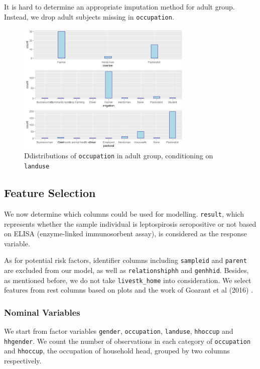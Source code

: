 \documentclass[11pt,twoside]{article}
\numberwithin{Theorem}{section}
\numberwithin{Definition}{section}
\numberwithin{Lemma}{section}
\numberwithin{Algorithm}{section}
\numberwithin{equation}{section}
\begin{document}
It is hard to determine an appropriate imputation method for adult group. Instead, we drop adult subjects missing in \texttt{occupation}.

\begin{figure}[!h]
	\centering
	\includegraphics[width = 0.75\textwidth]{Images/occupation_landuse.png}
	\caption{Ddistributions of \texttt{occupation} in adult group, conditioning on \texttt{landuse}}
	\label{fig:occ3}		
\end{figure} 

\subsection{Feature Selection}

We now determine which columns could be used for modelling. \texttt{result}, which represents whether the sample individual is leptospirosis seropositive or not based on ELISA (enzyme-linked immunosorbent assay), is considered as the response variable. 

As for potential risk factors, identifier columns including \texttt{sampleid} and \texttt{parent} are excluded from our model, as well as \texttt{relationshiphh} and \texttt{genhhid}. Besides, as mentioned before, we do not take \texttt{livestk\_home} into consideration. We select features from rest columns based on plots and the work of Goarant et al (2016) \cite{goarant2016leptospirosis}. 

\subsubsection{Nominal Variables}

We start from factor variables \texttt{gender}, \texttt{occupation}, \texttt{landuse}, \texttt{hhoccup} and \texttt{hhgender}. We count the number of observations in each category of \texttt{occupation} and \texttt{hhoccup}, the occupation of household head, grouped by two columns respectively.
\end{document}
